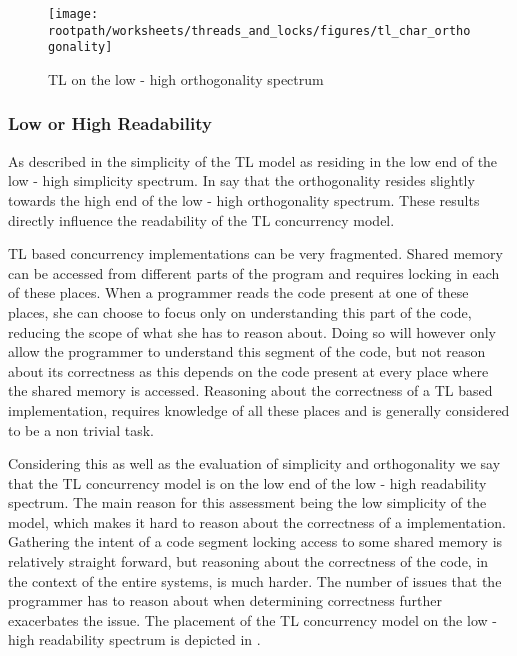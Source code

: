 \begin{figure}[htbp]
\centering
 \texttt{[image: \\rootpath/worksheets/threads\_and\_locks/figures/tl\_char\_orthogonality]} 
 \caption{\ac{TL} on the low - high orthogonality spectrum}
\label{fig:char_tl_orthogonality}
\end{figure}

\subsubsection{Low or High Readability}
\label{subsec:tl_char_readability}
As described in  the simplicity of the \ac{TL} model as residing in the low end of the low - high simplicity spectrum. In  say that the orthogonality resides slightly towards the high end of the low - high orthogonality spectrum. These results directly influence the readability of the \ac{TL} concurrency model.

\ac{TL} based concurrency implementations can be very fragmented. Shared memory can be accessed from different parts of the program and requires locking in each of these places. When a programmer reads the code present at one of these places, she can choose to focus only on understanding this part of the code, reducing the scope of what she has to reason about. Doing so will however only allow the programmer to understand this segment of the code, but not reason about its correctness as this depends on the code present at every place where the shared memory is accessed. Reasoning about the correctness of a \ac{TL} based implementation, requires knowledge of all these places and is generally considered to be a non trivial task.

Considering this as well as the evaluation of simplicity and orthogonality we say that the \ac{TL} concurrency model is on the low end of the low - high readability spectrum. The main reason for this assessment being the low simplicity of the model, which makes it hard to reason about the correctness of a implementation. Gathering the intent of a code segment locking access to some shared memory is relatively straight forward, but reasoning about the correctness of the code, in the context of the entire systems, is much harder. The number of issues that the programmer has to reason about when determining correctness further exacerbates the issue. The placement of the \ac{TL} concurrency model on the low - high readability spectrum is depicted in .

